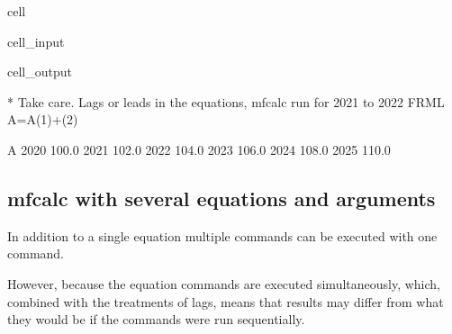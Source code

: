 \documentclass[letterpaper,10pt,english]{jupyterBook}
\begin{document}
\begin{sphinxuseclass}{cell}\begin{sphinxVerbatimInput}

\begin{sphinxuseclass}{cell_input}
\begin{sphinxVerbatim}[commandchars=\\\{\}]
\end{sphinxVerbatim}

\end{sphinxuseclass}\end{sphinxVerbatimInput}
\begin{sphinxVerbatimOutput}

\begin{sphinxuseclass}{cell_output}
\begin{sphinxVerbatim}[commandchars=\\\{\}]
* Take care. Lags or leads in the equations, mfcalc run for 2021 to 2022
FRML \PYGZlt{}\PYGZgt{} A=A(\PYGZhy{}1)+(2)\PYGZdl{}
\end{sphinxVerbatim}

\begin{sphinxVerbatim}[commandchars=\\\{\}]
          A
2020  100.0
2021  102.0
2022  104.0
2023  106.0
2024  108.0
2025  110.0
\end{sphinxVerbatim}

\end{sphinxuseclass}\end{sphinxVerbatimOutput}

\end{sphinxuseclass}

\subsection{mfcalc with several equations and arguments}
\label{\detokenize{content/04_PythonEssentials/mfcalc:mfcalc-with-several-equations-and-arguments}}
\sphinxAtStartPar
In addition to a single equation multiple commands can be executed with one command.

\sphinxAtStartPar
However,  because the equation commands are executed simultaneously, which, combined with the treatments of lags, means that results may differ from what they would be if the commands were run sequentially.
\end{document}
